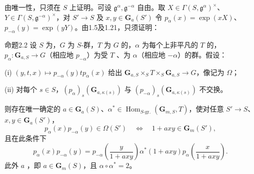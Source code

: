 由唯一性，只须在 $S$ 上证明。可设 $\mathfrak g^\alpha,\mathfrak g^{-\alpha}$ 自由。取 $X\in\Gamma(S,\mathfrak g^\alpha)^\times$、$Y\in\Gamma(S,\mathfrak g^{-\alpha})^\times$，对 $S'\to S$ 及 $x,y\in\mathbf G_a(S')$ 令 $p_\alpha(x)=\exp(xX)$、$p_{-\alpha}(y)=\exp(yY)$。由1.5及1.21，只须证明：
\begin{SGAresult}{命题}{2.2}
设 $S$ 为，$G$ 为 $S$-群，$T$ 为 $G$ 的，$\alpha$ 为每个上非平凡的 $T$ 的，$p_\alpha:\mathbf G_{a,S}\to G$（相应地 $p_{-\alpha}$）为受 $T$ 、为 $\alpha$（相应地 $-\alpha$）的群。假设：

(i) $(y,t,x)\mapsto p_{-\alpha}(y)t p_\alpha(x)$ 给出 $\mathbf G_{a,S}\times_ST\times_S\mathbf G_{a,S}\to G$，像记为 $\Omega$；

(ii) 对每个 $s\in S$，$(p_\alpha)_s(\mathbf G_{a,\kappa(s)})$ 与 $(p_{-\alpha})_s(\mathbf G_{a,\kappa(s)})$ 不交换。

则存在唯一确定的 $a\in\mathbf G_a(S)$、$\alpha^*\in\operatorname{Hom}_{S\text{-gr.}}(\mathbf G_{m,S},T)$，使对任意 $S'\to S$、$x,y\in\mathbf G_a(S')$，
\[p_\alpha(x)p_{-\alpha}(y)\in\Omega(S')\quad\Longleftrightarrow\quad1+axy\in\mathbf G_m(S'),\]
且在此条件下
\[p_\alpha(x)p_{-\alpha}(y)=p_{-\alpha}\left(\frac y{1+axy}\right)\alpha^*(1+axy)p_\alpha\left(\frac x{1+axy}\right).\]
此外 $a$ ，即 $a\in\mathbf G_m(S)$，且 $\alpha\circ\alpha^*=2$。
\end{SGAresult}
